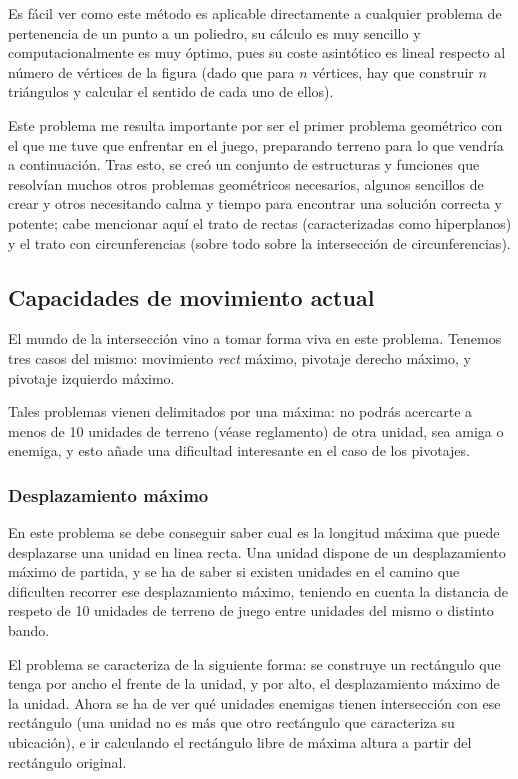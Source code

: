 Es fácil ver como este método es aplicable directamente a cualquier
problema de pertenencia de un punto a un poliedro, su cálculo es muy
sencillo y computacionalmente es muy óptimo, pues su coste asintótico
es lineal respecto al número de vértices de la figura (dado que para
$n$ vértices, hay que construir $n$ triángulos y calcular el sentido
de cada uno de ellos).

Este problema me resulta importante por ser el primer problema
geométrico con el que me tuve que enfrentar en el juego, preparando
terreno para lo que vendría a continuación. Tras esto, se creó un
conjunto de estructuras y funciones que resolvían muchos otros
problemas geométricos necesarios, algunos sencillos de crear y otros
necesitando calma y tiempo para encontrar una solución correcta y
potente; cabe mencionar aquí el trato de rectas (caracterizadas como
hiperplanos) y el trato con circunferencias (sobre todo sobre la
intersección de circunferencias).

\subsection{Capacidades de movimiento actual}
El mundo de la intersección vino a tomar forma viva en este
problema. Tenemos tres casos del mismo: movimiento \emph{rect} máximo,
pivotaje derecho máximo, y pivotaje izquierdo máximo.

Tales problemas vienen delimitados por una máxima: no podrás acercarte
a menos de 10 unidades de terreno (véase reglamento) de otra unidad, sea amiga o
enemiga, y esto añade una dificultad interesante en el caso de los
pivotajes.

\subsubsection{Desplazamiento máximo}
En este problema se debe conseguir saber cual es la longitud máxima
que puede desplazarse una unidad en linea recta. Una unidad dispone de
un desplazamiento máximo de partida, y se ha de saber si existen
unidades en el camino que dificulten recorrer ese desplazamiento
máximo, teniendo en cuenta la distancia de respeto de 10 unidades de
terreno de juego entre unidades del mismo o distinto bando.

El problema se caracteriza de la siguiente forma: se construye un
rectángulo que tenga por ancho el frente de la unidad, y por alto, el
desplazamiento máximo de la unidad. Ahora se ha de ver qué unidades
enemigas tienen intersección con ese rectángulo (una unidad no es más
que otro rectángulo que caracteriza su ubicación), e ir calculando el
rectángulo libre de máxima altura a partir del rectángulo original.

